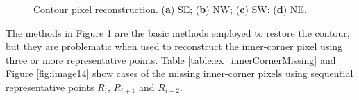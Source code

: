 \documentclass[sensors,article,accept,moreauthors,pdftex,10pt,a4paper]{mdpi}
\newcommand{\JHMEMO}[1]{\textcolor{red}{#1}}
\begin{document}
\begin{figure}[H]
	\centering
	\caption{Contour pixel reconstruction. (\textbf{a}) SE; (\textbf{b}) NW; (\textbf{c}) SW; (\textbf{d}) NE.}
	\label{fig:image13}
\end{figure}


The methods in Figure \ref{fig:image13} are the basic methods employed to restore the contour, but they are problematic when used to reconstruct the inner-corner pixel using three or more representative points. Table \ref{table:ex_innerCornerMissing} and Figure \ref{fig:image14} show cases of the missing inner-corner pixels using sequential representative points $R_i$, $R_{i+1}$ and $R_{i+2}$.
\end{document}

